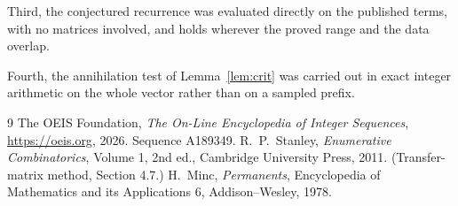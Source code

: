 \documentclass[11pt,a4paper]{article}
\theoremstyle{plain}
\theoremstyle{definition}
\begin{document}
Third, the conjectured recurrence was evaluated directly on the published terms, with no
matrices involved, and holds wherever the proved range and the data overlap.

Fourth, the annihilation test of Lemma~\ref{lem:crit} was carried out in exact integer
arithmetic on the whole vector rather than on a sampled prefix.

\begin{thebibliography}{9}
 The OEIS Foundation, \emph{The On-Line Encyclopedia of Integer
Sequences}, \url{https://oeis.org}, 2026. Sequence A189349.
 R.~P.~Stanley, \emph{Enumerative Combinatorics}, Volume 1, 2nd ed.,
Cambridge University Press, 2011. (Transfer-matrix method, Section 4.7.)
 H.~Minc, \emph{Permanents}, Encyclopedia of Mathematics and its
Applications 6, Addison--Wesley, 1978.
\end{thebibliography}
\end{document}
